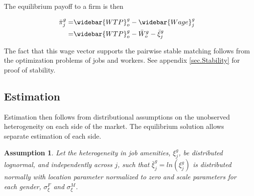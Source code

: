 \documentclass[12pt]{article}
\newtheorem{assumption}{Assumption}
\begin{document}
The equilibrium payoff to a firm is then

\begin{align}
  \bar{\pi}^g_j =& \widebar{WTP}^g_o - \widebar{Wage}^g_j \\ \nonumber
  =& \widebar{WTP}^g_o -  \bar{W}^g_o - \bar{\xi}^g_j
\end{align}

The fact that this wage vector supports the pairwise stable matching follows from the optimization problems of jobs and workers. See appendix \ref{sec.Stability} for proof of stability.



\subsection{Estimation}


Estimation then follows from distributional assumptions on the unobserved heterogeneity on each side of the market. The equilibrium solution allows separate estimation of each side.

\begin{assumption}
Let the heterogeneity in job amenities, $\xi^g_j$, be distributed lognormal, and independently across $j$, such that $\bar{\xi}^g_j = ln(\xi^g_j)$ is distributed normally with location parameter normalized to zero and scale parameters for each gender, $\sigma^F_{\xi}$ and $\sigma^M_{\xi}$.
\end{assumption}
\end{document}
